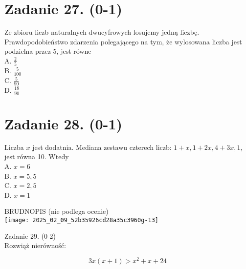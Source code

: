 \documentclass[10pt]{article}
\begin{document}
\section*{Zadanie 27. (0-1)}
Ze zbioru liczb naturalnych dwucyfrowych losujemy jedną liczbę. Prawdopodobieństwo zdarzenia polegającego na tym, że wylosowana liczba jest podzielna przez 5, jest równe\\
A. \(\frac{2}{5}\)\\
B. \(\frac{5}{100}\)\\
C. \(\frac{5}{90}\)\\
D. \(\frac{18}{90}\)

\section*{Zadanie 28. (0-1)}
Liczba \(x\) jest dodatnia. Mediana zestawu czterech liczb: \(1+x, 1+2 x, 4+3 x, 1\), jest równa 10. Wtedy\\
A. \(x=6\)\\
B. \(x=5,5\)\\
C. \(x=2,5\)\\
D. \(x=1\)

BRUDNOPIS (nie podlega ocenie)\\
\texttt{[image: 2025\_02\_09\_52b35926cd28a35c3960g-13]}

Zadanie 29. (0-2)\\
Rozwiąż nierówność:

\[
3 x(x+1)>x^{2}+x+24
\]
\end{document}
